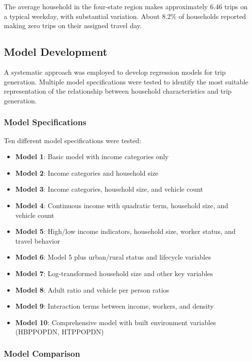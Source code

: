\documentclass[12pt]{article}
\begin{document}
The average household in the four-state region makes approximately 6.46 trips on a typical weekday, with substantial variation. About 8.2\% of households reported making zero trips on their assigned travel day.

\subsection{Model Development}

A systematic approach was employed to develop regression models for trip generation. Multiple model specifications were tested to identify the most suitable representation of the relationship between household characteristics and trip generation.

\subsubsection{Model Specifications}

Ten different model specifications were tested:
\begin{itemize}
\item \textbf{Model 1}: Basic model with income categories only
\item \textbf{Model 2}: Income categories and household size
\item \textbf{Model 3}: Income categories, household size, and vehicle count
\item \textbf{Model 4}: Continuous income with quadratic term, household size, and vehicle count
\item \textbf{Model 5}: High/low income indicators, household size, worker status, and travel behavior
\item \textbf{Model 6}: Model 5 plus urban/rural status and lifecycle variables
\item \textbf{Model 7}: Log-transformed household size and other key variables
\item \textbf{Model 8}: Adult ratio and vehicle per person ratios
\item \textbf{Model 9}: Interaction terms between income, workers, and density
\item \textbf{Model 10}: Comprehensive model with built environment variables (HBPPOPDN, HTPPOPDN)
\end{itemize}

\subsubsection{Model Comparison}
\end{document}

